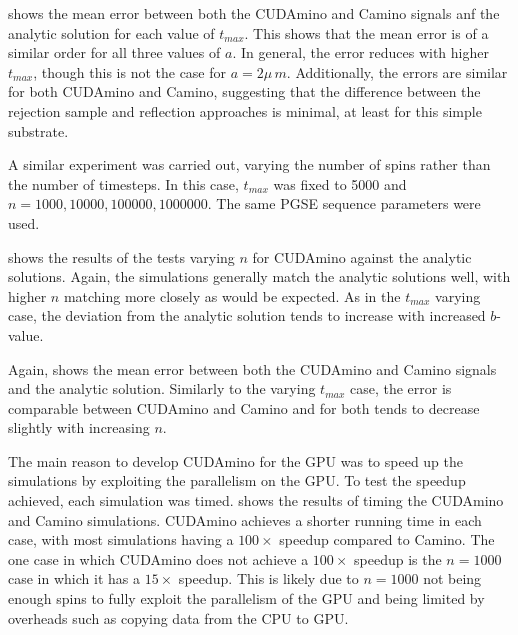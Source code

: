  shows the mean error between both the CUDAmino and Camino signals anf the analytic solution for each value of $t_{max}$. This shows that the mean error is of a similar order for all three values of $a$. In general, the error reduces with higher $t_{max}$, though this is not the case for $a=2\mu\,m$. Additionally, the errors are similar for both CUDAmino and Camino, suggesting that the difference between the rejection sample and reflection approaches is minimal, at least for this simple substrate. 

A similar experiment was carried out, varying the number of spins rather than the number of timesteps.
In this case, $t_{max}$ was fixed to 5000 and $n = 1000, 10000, 100000, 1000000$.
The same \ac{PGSE} sequence parameters were used.

 shows the results of the tests varying $n$ for CUDAmino against the analytic solutions. Again, the simulations generally match the analytic solutions well, with higher $n$ matching more closely as would be expected. As in the $t_{max}$ varying case, the deviation from the analytic solution tends to increase with increased $b$-value.

Again,  shows the mean error between both the CUDAmino and Camino signals and the analytic solution.
Similarly to the varying $t_{max}$ case, the error is comparable between CUDAmino and Camino and for both tends to decrease slightly  with increasing $n$. 

The main reason to develop CUDAmino for the \ac{GPU} was to speed up the simulations by exploiting the parallelism on the \ac{GPU}.
To test the speedup achieved, each simulation was timed.
 shows the results of timing the CUDAmino and Camino simulations.
CUDAmino achieves a shorter running time in each case, with most simulations having a  $100\times$ speedup compared to Camino.
The one case in which CUDAmino does not achieve a $100\times$ speedup is the $n=1000$ case in which it has a $15\times$ speedup.
This is likely due to $n=1000$ not being enough spins to fully exploit the parallelism of the GPU and being limited by overheads such as copying data from the \ac{CPU} to \ac{GPU}.



